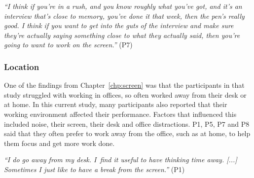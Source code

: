 \textit{``I think if you're in a rush, and you know roughly what you've got, and it's an interview that's close to
memory, you've done it that week, then the pen's really good. I think if you want to get into the guts of the interview
and make sure they're actually saying something close to what they actually said, then you're going to want to work on
the screen.''} (P7)






\subsubsection{Location}

One of the findings from Chapter~\ref{chp:screen} was that the participants in that study struggled with working in
offices, so often worked away from their desk or at home. In this current study, many participants also reported that
their working environment affected their performance. Factors that influenced this included noise, their screen, their
desk and office distractions. P1, P5, P7 and P8 said that they often prefer to work away from the office, such as at
home, to help them focus and get more work done.

\textit{``I do go away from my desk. I find it useful to have thinking time away. [...] Sometimes I just like to have a
break from the screen.''} (P1)

